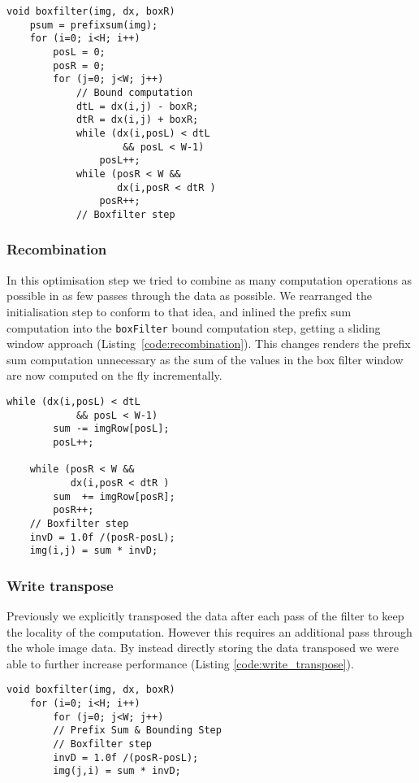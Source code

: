 \begin{lstlisting}[caption=Inlining of the bound computation, label=code:inlining]
void boxfilter(img, dx, boxR) 
    psum = prefixsum(img);
    for (i=0; i<H; i++)
        posL = 0;
        posR = 0;
        for (j=0; j<W; j++)
            // Bound computation
            dtL = dx(i,j) - boxR;
            dtR = dx(i,j) + boxR;
            while (dx(i,posL) < dtL 
                    && posL < W-1)
                posL++;
            while (posR < W && 
                   dx(i,posR < dtR )
                posR++;
            // Boxfilter step
\end{lstlisting}

\subsubsection{Recombination}

In this optimisation step we tried to combine as many computation operations as possible in as few passes through the data as possible. We rearranged the initialisation step to conform to that idea, and inlined the prefix sum computation into the \lstinline{boxFilter} bound computation step, getting a sliding window approach (Listing~\ref{code:recombination}). This changes renders the prefix sum computation unnecessary as the sum of the values in the box filter window are now computed on the fly incrementally.

\begin{lstlisting}[caption=Recombination, label=code:recombination]
    while (dx(i,posL) < dtL 
            && posL < W-1)
        sum -= imgRow[posL];
        posL++;

    while (posR < W && 
           dx(i,posR < dtR )
        sum  += imgRow[posR];
        posR++;
    // Boxfilter step
    invD = 1.0f /(posR-posL);
    img(i,j) = sum * invD;
\end{lstlisting}

\subsubsection{Write transpose}\label{sec:method:write_transposed}

Previously we explicitly transposed the data after each pass of the filter to keep the locality of the computation. However this requires an additional pass through the whole image data. By instead directly storing the data transposed we were able to further increase performance (Listing \ref{code:write_transpose}). 
\begin{lstlisting}[caption=Write transpose, label=code:write_transpose]
void boxfilter(img, dx, boxR) 
    for (i=0; i<H; i++)
        for (j=0; j<W; j++)
        // Prefix Sum & Bounding Step
        // Boxfilter step
        invD = 1.0f /(posR-posL);
        img(j,i) = sum * invD;
\end{lstlisting}

